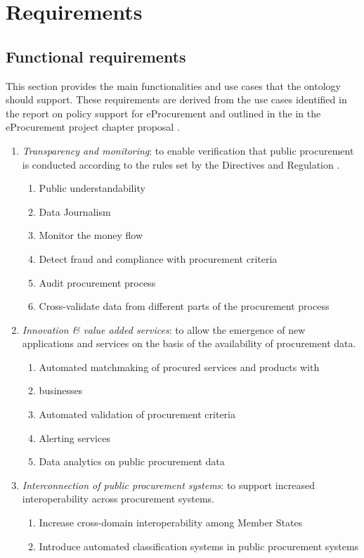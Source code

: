 \section{Requirements}
\label{sec:requirements}
	
	\subsection{Functional requirements}
	\label{sec:functional-requirements}	
	
	This section provides the main functionalities and use cases that the ontology should support. These requirements are derived from the use cases identified in the report on policy support for eProcurement \cite{d4.07-2016} and outlined in the in the eProcurement project chapter proposal \cite{d2.02-2017}.
	
	\begin{enumerate}
		\item \textit{Transparency and monitoring}: to enable verification that public procurement is conducted according to the rules set by the Directives and Regulation \citep{directive-2014/23/EU,directive-2014/24/EU,directive-2014/25/EU,directive-2014/55/EU}.
		\begin{enumerate}
			\item Public understandability
			\item Data Journalism
			\item Monitor the money flow
			\item Detect fraud and compliance with procurement criteria
			\item Audit procurement process
			\item Cross-validate data from different parts of the procurement process			
		\end{enumerate}
		\item \textit{Innovation \& value added services}: to allow the emergence of new applications and services on the basis of the availability of procurement data.
		\begin{enumerate}
			\item Automated matchmaking of procured services and products with \item businesses
			\item Automated validation of procurement criteria
			\item Alerting services
			\item Data analytics on public procurement data			
		\end{enumerate}
		\item \textit{Interconnection of public procurement systems}: to support increased interoperability across procurement systems.
		\begin{enumerate}
			\item Increase cross-domain interoperability among Member States 
			\item Introduce automated classification systems in public procurement systems			
		\end{enumerate}
	\end{enumerate}
	
